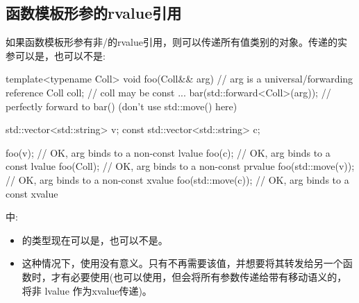 \subsection{函数模板形参的rvalue引用}

如果函数模板形参有非/的rvalue引用，则可以传递所有值类别的对象。传递的实参可以是，也可以不是:

\begin{cppcode}
template<typename Coll>
void foo(Coll&& arg) // arg is a universal/forwarding reference
{
	Coll coll; // coll may be const
	...
	bar(std::forward<Coll>(arg)); // perfectly forward to bar() (don’t use std::move() here)
}

std::vector<std::string> v;
const std::vector<std::string> c;

foo(v); // OK, arg binds to a non-const lvalue
foo(c); // OK, arg binds to a const lvalue
foo(Coll{}); // OK, arg binds to a non-const prvalue
foo(std::move(v)); // OK, arg binds to a non-const xvalue
foo(std::move(c)); // OK, arg binds to a const xvalue
\end{cppcode}

中:

\begin{itemize}
	\item {}的类型现在可以是，也可以不是。
	\item 这种情况下，使用没有意义。只有不再需要该值，并想要将其转发给另一个函数时，才有必要使用(也可以使用，但会将所有参数传递给带有移动语义的，将非 lvalue 作为xvalue传递)。
\end{itemize}













